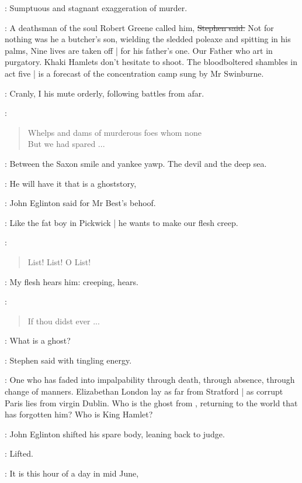 \StephenInt:
Sumptuous and stagnant exaggeration of murder.

\Stephen:
A deathsman of the soul Robert Greene called him,
\sout{Stephen said.}
Not for nothing was he a butcher's son,
wielding the sledded poleaxe and spitting in his palms,
Nine lives are taken off |
for his father's one.
Our Father who art in purgatory.
Khaki Hamlets don't hesitate to shoot.
The bloodboltered shambles in act five |
is a forecast of the concentration camp sung by Mr Swinburne.

\StephenInt:
Cranly,
I his mute orderly,
following battles from afar.

\StephenInt:
\begin{verse}
    Whelps and dams of murderous foes whom none \\
    But we had spared ...
\end{verse}

\StephenInt:
Between the Saxon smile and yankee yawp.
The devil and the deep sea.%

\eglinton:
He will have it that  is a ghoststory,

:
John Eglinton said for Mr Best's behoof.

\eglinton:
Like the fat boy in Pickwick |
he wants to make our flesh creep.

\StephenInt:
\begin{verse}
    List! List! O List!
\end{verse}

\StephenInt:
My flesh hears him:
creeping, hears.

\StephenInt:
\begin{verse}
    If thou didst ever ...
\end{verse}

\Stephen:
What is a ghost?

:
Stephen said with tingling energy.

\Stephen:
One who has faded into impalpability through death,
through absence,
through change of manners.
Elizabethan London lay as far from Stratford |
as corrupt Paris lies from virgin Dublin.
Who is the ghost from ,
returning to the world that has forgotten him?
Who is King Hamlet?

:
John Eglinton shifted his spare body,
leaning back to judge.

\StephenInt:
Lifted.

\Stephen:
It is this hour of a day in mid June,

